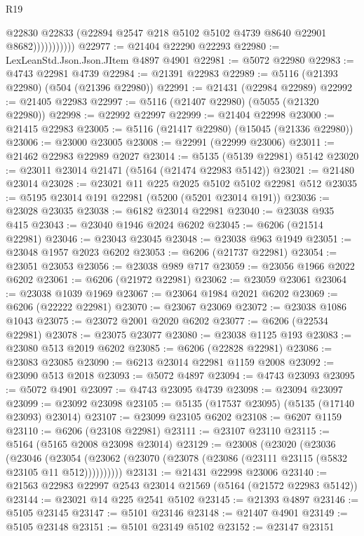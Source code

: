 \begin{lexlean}{R19}
\begin{coremodule}
{{{{{{{{{{{                        @22830
                        @22833
                        (@22894 @2547 @218 @5102 @5102 @4739 @8640 @22901 @8682)))))))))))
@22977 := @21404 @22290 @22293
@22980 := LexLeanStd.Json.Json.JItem @4897 @4901
@22981 := @5072 @22980
@22983 := @4743 @22981 @4739
@22984 := @21391 @22983
@22989 := @5116 (@21393 @22980) (@504 (@21396 @22980))
@22991 := @21431 (@22984 @22989)
@22992 := @21405 @22983
@22997 := @5116 (@21407 @22980) (@5055 (@21320 @22980))
@22998 := @22992 @22997
@22999 := @21404 @22998
@23000 := @21415 @22983
@23005 := @5116 (@21417 @22980) (@15045 (@21336 @22980))
@23006 := @23000 @23005
@23008 := @22991 (@22999 @23006)
@23011 := @21462 @22983 @22989 @2027
@23014 := @5135 (@5139 @22981) @5142
@23020 := @23011 @23014 @21471 (@5164 (@21474 @22983 @5142))
@23021 := @21480 @23014
@23028 := @23021 @11 @225 @2025 @5102 @5102 @22981 @512
@23035 := @5195 @23014 @191 @22981 (@5200 (@5201 @23014 @191))
@23036 := @23028 @23035
@23038 := @6182 @23014 @22981
@23040 := @23038 @935 @415
@23043 := @23040 @1946 @2024 @6202
@23045 := @6206 (@21514 @22981)
@23046 := @23043 @23045
@23048 := @23038 @963 @1949
@23051 := @23048 @1957 @2023 @6202
@23053 := @6206 (@21737 @22981)
@23054 := @23051 @23053
@23056 := @23038 @989 @717
@23059 := @23056 @1966 @2022 @6202
@23061 := @6206 (@21972 @22981)
@23062 := @23059 @23061
@23064 := @23038 @1039 @1969
@23067 := @23064 @1984 @2021 @6202
@23069 := @6206 (@22222 @22981)
@23070 := @23067 @23069
@23072 := @23038 @1086 @1043
@23075 := @23072 @2001 @2020 @6202
@23077 := @6206 (@22534 @22981)
@23078 := @23075 @23077
@23080 := @23038 @1125 @193
@23083 := @23080 @513 @2019 @6202
@23085 := @6206 (@22828 @22981)
@23086 := @23083 @23085
@23090 := @6213 @23014 @22981 @1159 @2008
@23092 := @23090 @513 @2018
@23093 := @5072 @4897
@23094 := @4743 @23093
@23095 := @5072 @4901
@23097 := @4743 @23095 @4739
@23098 := @23094 @23097
@23099 := @23092 @23098
@23105 := @5135 (@17537 @23095) (@5135 (@17140 @23093) @23014)
@23107 := @23099 @23105 @6202
@23108 := @6207 @1159
@23110 := @6206 (@23108 @22981)
@23111 := @23107 @23110
@23115 := @5164 (@5165 @2008 @23098 @23014)
@23129 := @23008
    (@23020
      (@23036
        (@23046
          (@23054 (@23062 (@23070 (@23078 (@23086 (@23111 @23115 (@5832 @23105 @11 @512))))))))))
@23131 := @21431 @22998 @23006
@23140 := @21563 @22983 @22997 @2543 @23014 @21569 (@5164 (@21572 @22983 @5142))
@23144 := @23021 @14 @225 @2541 @5102
@23145 := @21393 @4897
@23146 := @5105 @23145
@23147 := @5101 @23146
@23148 := @21407 @4901
@23149 := @5105 @23148
@23151 := @5101 @23149 @5102
@23152 := @23147 @23151
}}}}}}}}}}}
\end{coremodule}
\end{lexlean}
